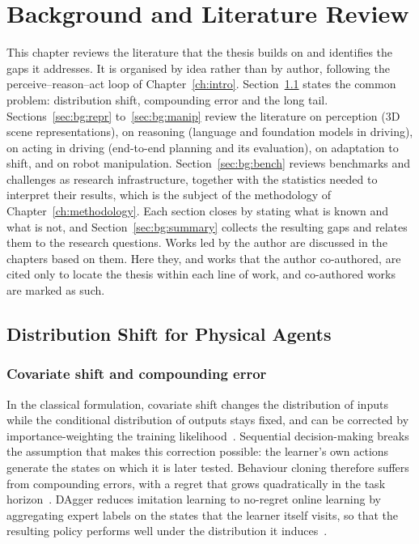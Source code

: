 \chapter{Background and Literature Review}\label{ch:background}

This chapter reviews the literature that the thesis builds on and identifies the gaps it addresses. It is organised by idea rather than by author, following the perceive--reason--act loop of Chapter~\ref{ch:intro}. Section~\ref{sec:bg:shift} states the common problem: distribution shift, compounding error and the long tail. Sections~\ref{sec:bg:repr} to~\ref{sec:bg:manip} review the literature on perception (3D scene representations), on reasoning (language and foundation models in driving), on acting in driving (end-to-end planning and its evaluation), on adaptation to shift, and on robot manipulation. Section~\ref{sec:bg:bench} reviews benchmarks and challenges as research infrastructure, together with the statistics needed to interpret their results, which is the subject of the methodology of Chapter~\ref{ch:methodology}. Each section closes by stating what is known and what is not, and Section~\ref{sec:bg:summary} collects the resulting gaps and relates them to the research questions. Works led by the author are discussed in the chapters based on them. Here they, and works that the author co-authored, are cited only to locate the thesis within each line of work, and co-authored works are marked as such.

\section{Distribution Shift for Physical Agents}\label{sec:bg:shift}

\subsection{Covariate shift and compounding error}

In the classical formulation, covariate shift changes the distribution of inputs while the conditional distribution of outputs stays fixed, and can be corrected by importance-weighting the training likelihood~\cite{shimodaira2000improving}. Sequential decision-making breaks the assumption that makes this correction possible: the learner's own actions generate the states on which it is later tested. Behaviour cloning therefore suffers from compounding errors, with a regret that grows quadratically in the task horizon~\cite{ross2010efficient}. DAgger reduces imitation learning to no-regret online learning by aggregating expert labels on the states that the learner itself visits, so that the resulting policy performs well under the distribution it induces~\cite{ross2011dagger}.

